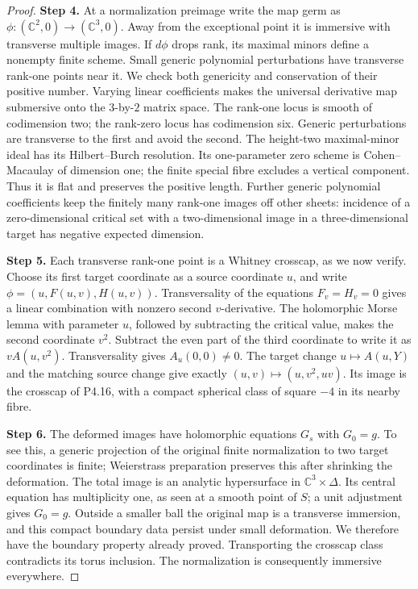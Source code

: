 \begin{proof}
\noindent\textbf{Step 4.} At a normalization preimage write the map germ as
$\phi:(\mathbb C^2,0)\to(\mathbb C^3,0)$. Away from the
exceptional point it is immersive with transverse multiple
images. If $d\phi$ drops rank, its maximal minors define a
nonempty finite scheme. Small generic polynomial
perturbations have transverse rank-one points near it.
We check both genericity and conservation of their positive
number. Varying linear coefficients makes the universal
derivative map submersive onto the $3$-by-$2$ matrix space.
The rank-one locus is smooth of codimension two; the rank-zero
locus has codimension six. Generic perturbations are transverse
to the first and avoid the second. The height-two maximal-minor
ideal has its Hilbert--Burch resolution. Its one-parameter
zero scheme is Cohen--Macaulay of dimension one; the finite
special fibre excludes a vertical component. Thus it is flat
and preserves the positive length. Further generic polynomial
coefficients keep the finitely many rank-one images off other
sheets: incidence of a zero-dimensional critical set with a
two-dimensional image in a three-dimensional target has
negative expected dimension.

\noindent\textbf{Step 5.} Each transverse rank-one point is a Whitney crosscap, as we
now verify. Choose its first target coordinate as a source
coordinate $u$, and write $\phi=(u,F(u,v),H(u,v))$.
Transversality of the equations $F_v=H_v=0$ gives a linear
combination with nonzero second $v$-derivative. The
holomorphic Morse lemma with parameter $u$, followed by
subtracting the critical value, makes the second coordinate
$v^2$. Subtract the even part of the third coordinate to
write it as $vA(u,v^2)$. Transversality gives $A_u(0,0)\ne0$.
The target change $u\mapsto A(u,Y)$ and the matching source
change give exactly $(u,v)\mapsto(u,v^2,uv)$.
Its image is the crosscap of P4.16, with a compact spherical
class of square $-4$ in its nearby fibre.

\noindent\textbf{Step 6.} The deformed images have holomorphic equations $G_s$ with
$G_0=g$. To see this, a generic projection of the original
finite normalization to two target coordinates is finite;
Weierstrass preparation preserves this after shrinking the
deformation. The total image is an analytic hypersurface
in $\mathbb C^3\times\Delta$. Its central equation has
multiplicity one, as seen at a smooth point of $S$; a unit
adjustment gives $G_0=g$. Outside a smaller ball the original
map is a transverse immersion, and this compact boundary
data persist under small deformation. We therefore have
the boundary property already proved. Transporting the
crosscap class contradicts its torus inclusion. The
normalization is consequently immersive everywhere.


\end{proof}
